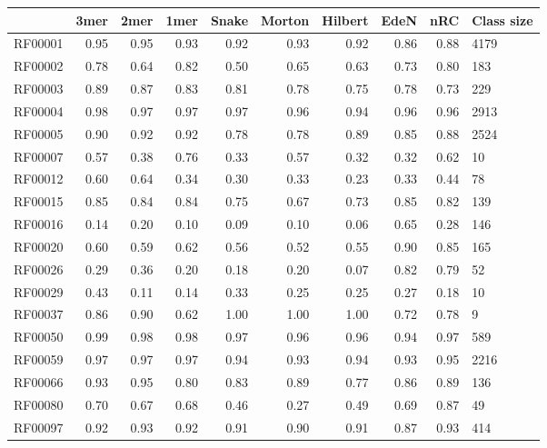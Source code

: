 \begin{tabular}{lrrrrrrrrl}
\toprule
{} &  3mer &  2mer &  1mer &  Snake &  Morton &  Hilbert &  EdeN &  nRC & Class size \\
\midrule
RF00001      &  0.95 &  0.95 &  0.93 &   0.92 &    0.93 &     0.92 &  0.86 & 0.88 &       4179 \\
RF00002      &  0.78 &  0.64 &  0.82 &   0.50 &    0.65 &     0.63 &  0.73 & 0.80 &        183 \\
RF00003      &  0.89 &  0.87 &  0.83 &   0.81 &    0.78 &     0.75 &  0.78 & 0.73 &        229 \\
RF00004      &  0.98 &  0.97 &  0.97 &   0.97 &    0.96 &     0.94 &  0.96 & 0.96 &       2913 \\
RF00005      &  0.90 &  0.92 &  0.92 &   0.78 &    0.78 &     0.89 &  0.85 & 0.88 &       2524 \\
RF00007      &  0.57 &  0.38 &  0.76 &   0.33 &    0.57 &     0.32 &  0.32 & 0.62 &         10 \\
RF00012      &  0.60 &  0.64 &  0.34 &   0.30 &    0.33 &     0.23 &  0.33 & 0.44 &         78 \\
RF00015      &  0.85 &  0.84 &  0.84 &   0.75 &    0.67 &     0.73 &  0.85 & 0.82 &        139 \\
RF00016      &  0.14 &  0.20 &  0.10 &   0.09 &    0.10 &     0.06 &  0.65 & 0.28 &        146 \\
RF00020      &  0.60 &  0.59 &  0.62 &   0.56 &    0.52 &     0.55 &  0.90 & 0.85 &        165 \\
RF00026      &  0.29 &  0.36 &  0.20 &   0.18 &    0.20 &     0.07 &  0.82 & 0.79 &         52 \\
RF00029      &  0.43 &  0.11 &  0.14 &   0.33 &    0.25 &     0.25 &  0.27 & 0.18 &         10 \\
RF00037      &  0.86 &  0.90 &  0.62 &   1.00 &    1.00 &     1.00 &  0.72 & 0.78 &          9 \\
RF00050      &  0.99 &  0.98 &  0.98 &   0.97 &    0.96 &     0.96 &  0.94 & 0.97 &        589 \\
RF00059      &  0.97 &  0.97 &  0.97 &   0.94 &    0.93 &     0.94 &  0.93 & 0.95 &       2216 \\
RF00066      &  0.93 &  0.95 &  0.80 &   0.83 &    0.89 &     0.77 &  0.86 & 0.89 &        136 \\
RF00080      &  0.70 &  0.67 &  0.68 &   0.46 &    0.27 &     0.49 &  0.69 & 0.87 &         49 \\
RF00097      &  0.92 &  0.93 &  0.92 &   0.91 &    0.90 &     0.91 &  0.87 & 0.93 &        414 \\

\end{tabular}
